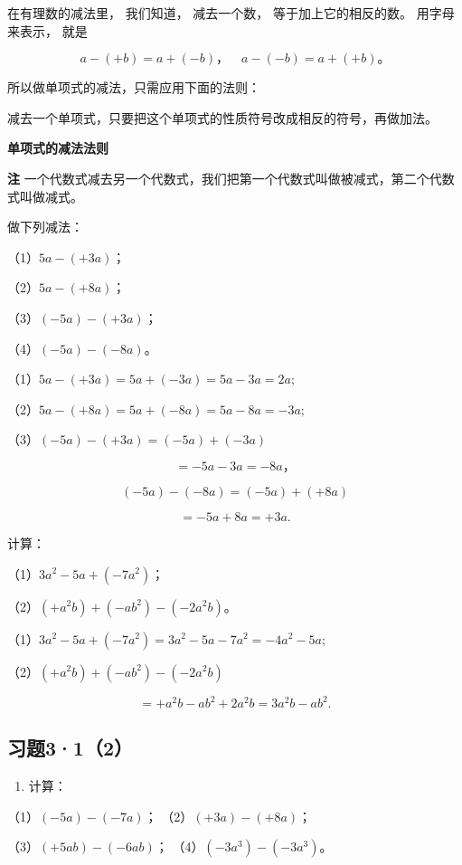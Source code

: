 在有理数的减法里， 我们知道， 减去一个数， 等于加上它的相反的数。
用字母来表示， 就是

\[
a - (+ b) = a + (- b)\text{，} \quad a - (- b) = a + (+ b)\text{。}
\]

所以做单项式的减法，只需应用下面的法则：

减去一个单项式，只要把这个单项式的性质符号改成相反的符号，再做加法。

\textbf{单项式的减法法则}

\textbf{注}
一个代数式减去另一个代数式，我们把第一个代数式叫做被减式，第二个代数式叫做减式。

 做下列减法：

（1）\(5a - (+3a)\)；

（2）\(5a - (+8a)\)；

（3）\((-5a) - (+3a)\)；

（4）\((-5a) - (-8a)\)。

 （1）\(5a - (+3a) = 5a + (-3a) = 5a - 3a = 2a;\)

（2）\(5a - (+8a) = 5a + (-8a) = 5a - 8a = -3a;\)

（3）\((-5a) - (+3a) = (-5a) + (-3a)\)

\[
= - 5 a - 3 a = - 8 a\text{，}
\]

\[
(- 5 a) - (- 8 a) = (- 5 a) + (+ 8 a) \tag {4}
\]

\[
= - 5 a + 8 a = + 3 a.
\]

 计算：

（1）\(3a^{2} - 5a + (-7a^{2})\)；

（2）\((+a^{2}b) + (-ab^{2}) - (-2a^{2}b)\)。

（1）\(3a^{2} - 5a + (-7a^{2}) = 3a^{2} - 5a - 7a^{2} = -4a^{2} - 5a;\)

（2）\((+a^{2}b) + (-ab^{2}) - (-2a^{2}b)\)

\[
= + a ^{2} b - a b ^{2} + 2 a ^{2} b = 3 a ^{2} b - a b ^{2}.
\]

\subsection{习题3·1（2）}

\begin{enumerate}
\item
  计算：
\end{enumerate}

（1）\((-5a) - (-7a)\)； （2）\((+3a) - (+8a)\)；

（3）\((+5ab) - (-6ab)\)； （4）\((-3a^3) - (-3a^3)\)。

